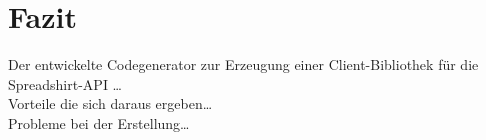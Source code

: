 \section{Fazit}
\label{sec:conclusion}


Der entwickelte Codegenerator zur Erzeugung einer Client-Bibliothek für die Spreadshirt-\gls{API} \ldots\\
Vorteile die sich daraus ergeben\ldots\\
Probleme bei der Erstellung\ldots

